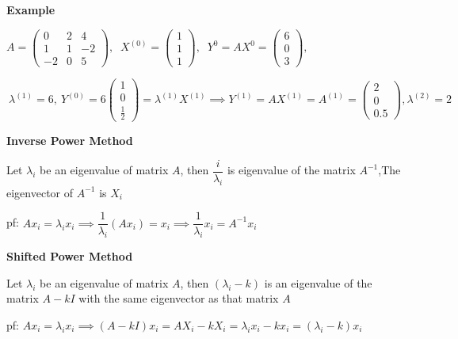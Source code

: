 \textbf{Example}

\begin{tcolorbox}
	$A = \left( \begin{matrix}
		0&2&4\\1&1&-2\\-2&0&5
	\end{matrix}\right),$
	$~X^{(0)} = \left(\begin{matrix}
		1\\1\\1
	\end{matrix}\right),$
	$~Y^{0} = AX^{0} = \left(\begin{matrix}
		6\\0\\3
	\end{matrix}\right),$
	
	
	$~\lambda^{(1)} = 6,~ Y^{(0)} = 6\left(\begin{matrix}
		1\\0\\\frac{1}{2}
	\end{matrix}\right) = \lambda^{(1)}X^{(1)} \implies Y^{(1)} = AX^{(1)} = A^{(1)} = \left(\begin{matrix}
		2\\0\\0.5
	\end{matrix}\right), \lambda^{(2)} = 2$
\end{tcolorbox}

\textbf{Inverse Power Method}

\begin{tcolorbox}
	Let $\lambda_i$ be an eigenvalue of matrix $A$, then $\dfrac{i}{\lambda_i}$ is eigenvalue of the matrix $A^{-1}$,The eigenvector of $A^{-1}$ is $X_i$
	
	pf: $Ax_i = \lambda_ix_i \implies \dfrac{1}{\lambda_i}\left( Ax_i \right) = x_i \implies \dfrac{1}{\lambda_i}x_i = A^{-1}x_i$
\end{tcolorbox}

\textbf{Shifted Power Method}

\begin{tcolorbox}
	Let $\lambda_i$ be an eigenvalue of matrix $A$, then $(\lambda_i - k)$ is an eigenvalue of the matrix $A-kI$ with the same eigenvector as that matrix $A$
	
	pf: $Ax_i = \lambda_ix_i \implies (A-kI)x_i = AX_i - kX_i = \lambda_ix_i - kx_i = (\lambda_i - k)x_i$
\end{tcolorbox}

\newpage

